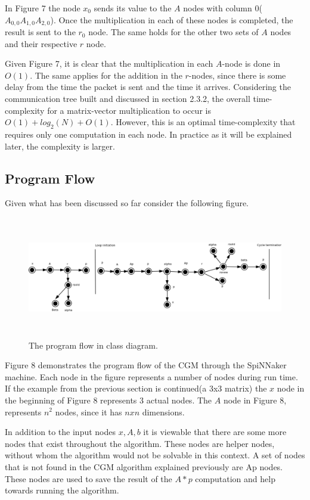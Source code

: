 \documentclass[12pt,a4paper]{article}
\begin{document}
In Figure 7 the node $x_0$ sends its value to the $A$ nodes with column 0($A_{0,0} A_{1,0} A_{2,0}$). Once the multiplication in each of these nodes is completed, the result is sent to the $r_0$ node. The same holds for the other two sets of $A$ nodes and their respective $r$ node. 

Given Figure 7, it is clear that the multiplication in each $A$-node is done in $O(1)$. The same applies for the addition in the $r$-nodes, since there is some delay from the time the packet is sent and the time it arrives. Considering the communication tree built and discussed in section 2.3.2, the overall time-complexity for a matrix-vector multiplication to occur is $O(1)+log_2(N)+O(1)$. However, this is an optimal time-complexity that requires only one computation in each node. In practice as it will be explained later, the complexity is larger.
\subsection{Program Flow}
Given what has been discussed so far consider the following figure.
\begin{figure}[h!]
\includegraphics[width=500pt,height=150pt,scale=1]{Pics/program_flow.png}
\centering
\caption{The program flow in class diagram.}
\end{figure}
Figure 8 demonstrates the program flow of the CGM through the SpiNNaker machine. Each node in the figure represents a number of nodes during run time. If the example from the previous section is continued(a 3x3 matrix) the $x$ node in the beginning of Figure 8 represents 3 actual nodes. The $A$ node in Figure 8, represents $n^2$ nodes, since it has $nxn$ dimensions.

In addition to the input nodes $x,A,b$ it is viewable that there are some more nodes that exist throughout the algorithm. These nodes are helper nodes, without whom the algorithm would not be solvable in this context. A set of nodes that is not found in the CGM algorithm explained previously are Ap nodes. These nodes are used to save the result of the $A*p$ computation and help towards running the algorithm.
\end{document}
